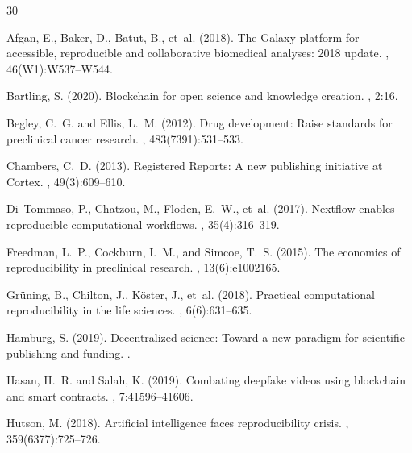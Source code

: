 \documentclass[11pt,a4paper]{article}
\begin{document}
\begin{thebibliography}{30}

Afgan, E., Baker, D., Batut, B., et~al. (2018).
\newblock The Galaxy platform for accessible, reproducible and collaborative biomedical analyses: 2018 update.
, 46(W1):W537--W544.

Bartling, S. (2020).
\newblock Blockchain for open science and knowledge creation.
, 2:16.

Begley, C.~G. and Ellis, L.~M. (2012).
\newblock Drug development: Raise standards for preclinical cancer research.
, 483(7391):531--533.

Chambers, C.~D. (2013).
\newblock Registered Reports: A new publishing initiative at Cortex.
, 49(3):609--610.

Di~Tommaso, P., Chatzou, M., Floden, E.~W., et~al. (2017).
\newblock Nextflow enables reproducible computational workflows.
, 35(4):316--319.

Freedman, L.~P., Cockburn, I.~M., and Simcoe, T.~S. (2015).
\newblock The economics of reproducibility in preclinical research.
, 13(6):e1002165.

Gr\"{u}ning, B., Chilton, J., K\"{o}ster, J., et~al. (2018).
\newblock Practical computational reproducibility in the life sciences.
, 6(6):631--635.

Hamburg, S. (2019).
\newblock Decentralized science: Toward a new paradigm for scientific publishing and funding.
.

Hasan, H.~R. and Salah, K. (2019).
\newblock Combating deepfake videos using blockchain and smart contracts.
, 7:41596--41606.

Hutson, M. (2018).
\newblock Artificial intelligence faces reproducibility crisis.
, 359(6377):725--726.


\end{thebibliography}
\end{document}
